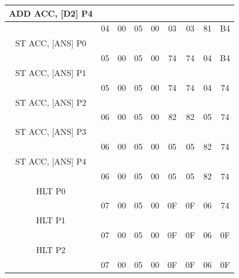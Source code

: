\documentclass[dvipdfmx]{jsarticle}
\begin{document}
\begin{table}[H]
\begin{tabular}{|c|c|c|c|c|c|c|c|c|}
           \hline
           ADD ACC, [D2] P4 &&&&&&&& \\
           \hline
           & 04 & 00 & 05 & 00 & 03 & 03 & 81 & B4 \\
           \hline
           ST ACC, [ANS] P0 &&&&&&&& \\
           \hline
           & 05 & 00 & 05 & 00 & 74 & 74 & 04 & B4 \\
           \hline
           ST ACC, [ANS] P1 &&&&&&&& \\
           \hline
           & 05 & 00 & 05 & 00 & 74 & 74 & 04 & 74 \\
           \hline
           ST ACC, [ANS] P2 &&&&&&&& \\
           \hline
           & 06 & 00 & 05 & 00 & 82 & 82 & 05 & 74 \\
           \hline
           ST ACC, [ANS] P3 &&&&&&&& \\
           \hline
           & 06 & 00 & 05 & 00 & 05 & 05 & 82 & 74 \\
           \hline
           ST ACC, [ANS] P4 &&&&&&&& \\
           \hline
           & 06 & 00 & 05 & 00 & 05 & 05 & 82 & 74 \\
           \hline
           HLT P0 &&&&&&&& \\
           \hline
           & 07 & 00 & 05 & 00 & 0F & 0F & 06 & 74 \\
           \hline
           HLT P1 &&&&&&&& \\
           \hline
           & 07 & 00 & 05 & 00 & 0F & 0F & 06 & 0F \\
           \hline
           HLT P2 &&&&&&&& \\
           \hline
           & 07 & 00 & 05 & 00 & 0F & 0F & 06 & 0F \\
           \hline
    \end{tabular}
\end{table}
\end{document}
